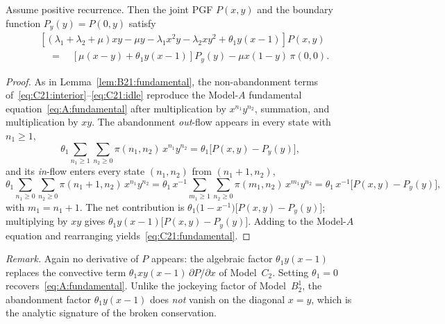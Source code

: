 \begin{lemma}\label{lem:C21:fundamental}
Assume positive recurrence. Then the joint PGF $P(x,y)$ and the boundary function
$P_y(y)=P(0,y)$ satisfy
\begin{equation}
    \begin{split}
        &\left[(\lambda_1+\lambda_2+\mu)xy - \mu y - \lambda_1 x^2y - \lambda_2 xy^2
               + \theta_1 y(x-1)\right]P(x,y) \\
        &\quad=\quad \left[\mu(x-y) + \theta_1 y(x-1)\right]P_y(y)
               - \mu x(1-y)\,\pi(0,0).
    \end{split}
    \label{eq:C21:fundamental}
\end{equation}
\end{lemma}

\begin{proof}
As in Lemma~\ref{lem:B21:fundamental}, the non-abandonment terms
of~\eqref{eq:C21:interior}--\eqref{eq:C21:idle} reproduce the Model-$A$ fundamental
equation~\eqref{eq:A:fundamental} after multiplication by $x^{n_1}y^{n_2}$, summation, and
multiplication by $xy$. The abandonment \emph{out}-flow appears in every state with
$n_1\ge1$,
\begin{equation*}
    \theta_1\sum_{n_1\ge1}\sum_{n_2\ge0}\pi(n_1,n_2)\,x^{n_1}y^{n_2}
    = \theta_1\bigl[P(x,y)-P_y(y)\bigr],
\end{equation*}
and its \emph{in}-flow enters every state $(n_1,n_2)$ from $(n_1+1,n_2)$,
\begin{equation*}
    \theta_1\sum_{n_1\ge0}\sum_{n_2\ge0}\pi(n_1+1,n_2)\,x^{n_1}y^{n_2}
    = \theta_1\,x^{-1}\sum_{m_1\ge1}\sum_{n_2\ge0}\pi(m_1,n_2)\,x^{m_1}y^{n_2}
    = \theta_1\,x^{-1}\bigl[P(x,y)-P_y(y)\bigr],
\end{equation*}
with $m_1=n_1+1$. The net contribution is
$\theta_1\bigl(1-x^{-1}\bigr)\bigl[P(x,y)-P_y(y)\bigr]$; multiplying by $xy$ gives
$\theta_1 y(x-1)\bigl[P(x,y)-P_y(y)\bigr]$. Adding to the Model-$A$ equation and
rearranging yields~\eqref{eq:C21:fundamental}.
\end{proof}

\noindent\textit{Remark.}
Again no derivative of $P$ appears: the algebraic factor $\theta_1 y(x-1)$ replaces the
convective term $\theta_1 xy(x-1)\,\partial P/\partial x$ of Model~$C_2$. Setting
$\theta_1=0$ recovers~\eqref{eq:A:fundamental}. Unlike the jockeying factor of
Model~$B_2^1$, the abandonment factor $\theta_1 y(x-1)$ does \emph{not} vanish on the
diagonal $x=y$, which is the analytic signature of the broken conservation.

